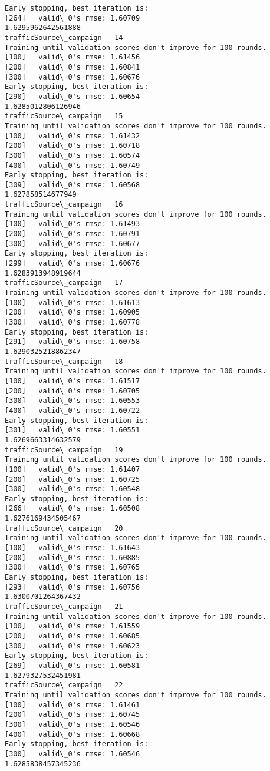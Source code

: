 \documentclass[11pt]{article}
\begin{document}
\begin{Verbatim}[commandchars=\\\{\}]
Early stopping, best iteration is:
[264]	valid\_0's rmse: 1.60709
1.6295962642561888
trafficSource\_campaign   14
Training until validation scores don't improve for 100 rounds.
[100]	valid\_0's rmse: 1.61456
[200]	valid\_0's rmse: 1.60841
[300]	valid\_0's rmse: 1.60676
Early stopping, best iteration is:
[290]	valid\_0's rmse: 1.60654
1.6285012806126946
trafficSource\_campaign   15
Training until validation scores don't improve for 100 rounds.
[100]	valid\_0's rmse: 1.61432
[200]	valid\_0's rmse: 1.60718
[300]	valid\_0's rmse: 1.60574
[400]	valid\_0's rmse: 1.60749
Early stopping, best iteration is:
[309]	valid\_0's rmse: 1.60568
1.627858514677949
trafficSource\_campaign   16
Training until validation scores don't improve for 100 rounds.
[100]	valid\_0's rmse: 1.61493
[200]	valid\_0's rmse: 1.60791
[300]	valid\_0's rmse: 1.60677
Early stopping, best iteration is:
[299]	valid\_0's rmse: 1.60676
1.6283913948919644
trafficSource\_campaign   17
Training until validation scores don't improve for 100 rounds.
[100]	valid\_0's rmse: 1.61613
[200]	valid\_0's rmse: 1.60905
[300]	valid\_0's rmse: 1.60778
Early stopping, best iteration is:
[291]	valid\_0's rmse: 1.60758
1.6290325218862347
trafficSource\_campaign   18
Training until validation scores don't improve for 100 rounds.
[100]	valid\_0's rmse: 1.61517
[200]	valid\_0's rmse: 1.60705
[300]	valid\_0's rmse: 1.60553
[400]	valid\_0's rmse: 1.60722
Early stopping, best iteration is:
[301]	valid\_0's rmse: 1.60551
1.6269663314632579
trafficSource\_campaign   19
Training until validation scores don't improve for 100 rounds.
[100]	valid\_0's rmse: 1.61407
[200]	valid\_0's rmse: 1.60725
[300]	valid\_0's rmse: 1.60548
Early stopping, best iteration is:
[266]	valid\_0's rmse: 1.60508
1.6276169434505467
trafficSource\_campaign   20
Training until validation scores don't improve for 100 rounds.
[100]	valid\_0's rmse: 1.61643
[200]	valid\_0's rmse: 1.60885
[300]	valid\_0's rmse: 1.60765
Early stopping, best iteration is:
[293]	valid\_0's rmse: 1.60756
1.6300701264367432
trafficSource\_campaign   21
Training until validation scores don't improve for 100 rounds.
[100]	valid\_0's rmse: 1.61559
[200]	valid\_0's rmse: 1.60685
[300]	valid\_0's rmse: 1.60623
Early stopping, best iteration is:
[269]	valid\_0's rmse: 1.60581
1.6279327532451981
trafficSource\_campaign   22
Training until validation scores don't improve for 100 rounds.
[100]	valid\_0's rmse: 1.61461
[200]	valid\_0's rmse: 1.60745
[300]	valid\_0's rmse: 1.60546
[400]	valid\_0's rmse: 1.60668
Early stopping, best iteration is:
[300]	valid\_0's rmse: 1.60546
1.6285838457345236

\end{Verbatim}
\end{document}
